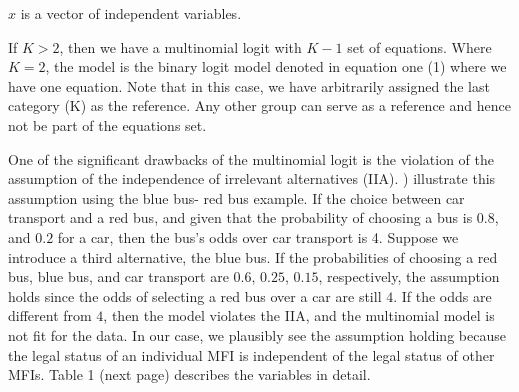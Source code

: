\documentclass[a4paper, nobind]{templates/ociamthesis}
\begin{document}
\(x\) is a vector of independent variables.

If \(K>2\), then we have a multinomial logit with \(K-1\) set of equations. Where \(K=2\), the model is the binary logit model denoted in equation one (1) where we have one equation. Note that in this case, we have arbitrarily assigned the last category (K) as the reference. Any other group can serve as a reference and hence not be part of the equations set.

One of the significant drawbacks of the multinomial logit is the violation of the assumption of the independence of irrelevant alternatives (IIA). \textcite{cheng2007testing} ) illustrate this assumption using the blue bus- red bus example. If the choice between car transport and a red bus, and given that the probability of choosing a bus is \(0.8\), and \(0.2\) for a car, then the bus's odds over car transport is 4. Suppose we introduce a third alternative, the blue bus. If the probabilities of choosing a red bus, blue bus, and car transport are \(0.6\), \(0.25\), \(0.15\), respectively, the assumption holds since the odds of selecting a red bus over a car are still \(4\). If the odds are different from \(4\), then the model violates the IIA, and the multinomial model is not fit for the data. In our case, we plausibly see the assumption holding because the legal status of an individual MFI is independent of the legal status of other MFIs. Table 1 (next page) describes the variables in detail.
\end{document}
